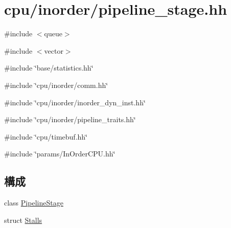 \hypertarget{pipeline__stage_8hh}{
\section{cpu/inorder/pipeline\_\-stage.hh}
\label{pipeline__stage_8hh}
}
{\ttfamily \#include $<$queue$>$}\par
{\ttfamily \#include $<$vector$>$}\par
{\ttfamily \#include \char`\"{}base/statistics.hh\char`\"{}}\par
{\ttfamily \#include \char`\"{}cpu/inorder/comm.hh\char`\"{}}\par
{\ttfamily \#include \char`\"{}cpu/inorder/inorder\_\-dyn\_\-inst.hh\char`\"{}}\par
{\ttfamily \#include \char`\"{}cpu/inorder/pipeline\_\-traits.hh\char`\"{}}\par
{\ttfamily \#include \char`\"{}cpu/timebuf.hh\char`\"{}}\par
{\ttfamily \#include \char`\"{}params/InOrderCPU.hh\char`\"{}}\par
\subsection*{構成}
\begin{DoxyCompactItemize}
\item 
class \hyperlink{classPipelineStage}{PipelineStage}
\item 
struct \hyperlink{structPipelineStage_1_1Stalls}{Stalls}
\end{DoxyCompactItemize}
